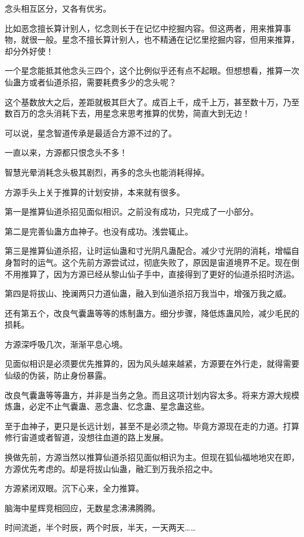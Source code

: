 \begin{this_body}
念头相互区分，又各有优劣。

比如恶念擅长算计别人，忆念则长于在记忆中挖掘内容。但这两者，用来推算事物，就很一般。星念不擅长算计别人，也不精通在记忆里挖掘内容，但用来推算，却分外好使！

一个星念能抵其他念头三四个，这个比例似乎还有点不起眼。但想想看，推算一次仙蛊方或者仙道杀招，需要耗费多少的念头呢？

这个基数放大之后，差距就极其巨大了。成百上千，成千上万，甚至数十万，乃至数百万的念头消耗下去，用星念来思考推算的优势，简直大到无边！

可以说，星念智道传承是最适合方源不过的了。

一直以来，方源都只恨念头不多！

智慧光晕消耗念头极其剧烈，再多的念头也能消耗得掉。

方源手头上关于推算的计划安排，本来就有很多。

第一是推算仙道杀招见面似相识。之前没有成功，只完成了一小部分。

第二是完善仙蛊方血神子。也没有成功。浅尝辄止。

第三是推算仙道杀招，让时运仙蛊和寸光阴凡蛊配合。减少寸光阴的消耗，增幅自身暂时的运气。这个先前方源尝试过，彻底失败了，原因是宙道境界不足。现在倒不用推算了，因为方源已经从黎山仙子手中，直接得到了更好的仙道杀招时济运。

第四是将拔山、挽澜两只力道仙蛊，融入到仙道杀招万我当中，增强万我之威。

还有第五个，改良气囊蛊等等的炼制蛊方。细分步骤，降低炼蛊风险，减少毛民的损耗。

方源深呼吸几次，渐渐平息心境。

见面似相识是必须要优先推算的，因为风头越来越紧，方源要在外行走，就得需要仙级的伪装，防止身份暴露。

改良气囊蛊等等蛊方，并非是当务之急。而且这项计划内容太多。将来方源大规模炼蛊，必定不止气囊蛊、恶念蛊、忆念蛊、星念蛊这些。

至于血神子，更只是长远计划，甚至不是必须之物。毕竟方源现在走的力道。打算修行宙道或者智道，没想往血道的路上发展。

换做先前，方源当然以推算仙道杀招见面似相识为主。但现在狐仙福地地灾在即，方源优先考虑的。却是将拔山仙蛊，融汇到万我杀招之中。

方源紧闭双眼。沉下心来，全力推算。

脑海中星辉竞相回应，无数星念沸沸腾腾。

时间流逝，半个时辰，两个时辰，半天，一天两天……


\end{this_body}
